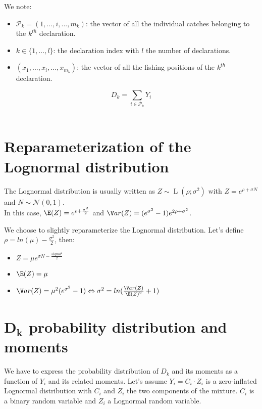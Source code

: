 We note:

\begin{itemize}
\item
  \(\boldsymbol{\mathcal{P}}_k=(1,...,i, ...,m_{k})\): the vector of all the individual catches belonging to the \(k^{th}\) declaration.
\item
  \(k \in \{1,...,l\}\): the declaration index with \(l\) the number of declarations.
\item
  \((x_1,...,x_i, ...,x_{m_k})\): the vector of all the fishing positions of the \(k^{th}\) declaration.
\end{itemize}

\[D_k=\sum_{i \in \boldsymbol{\mathcal{P}}_k}{Y_{i}}\] \\

\section{Reparameterization of the Lognormal distribution}

The Lognormal distribution is usually written as \(Z \sim \operatorname{L}(\rho;\sigma^2)\) with \(Z=e^{\rho+\sigma N}\) and \(N \sim \mathcal{N}(0,1)\). \\

In this case, \(\E(Z)=e^{\rho + \frac{\sigma^2}{2}}\) and \(\V ar(Z)=(e^{\sigma^2}-1)e^{2 \rho + \sigma^2}\).

We choose to slightly reparameterize the Lognormal distribution. Let's define \(\rho = ln(\mu) - \frac{\sigma^2}{2}\), then:

\begin{itemize}
\item
  \(Z=\mu e^{\sigma N - \frac{sigma^2}{2}}\)
\item
  \(\E(Z)=\mu\)
\item
  \(\V ar(Z)=\mu^2(e^{\sigma^2} - 1) \Leftrightarrow \sigma^2=ln(\frac{\V ar(Z)}{\E(Z)^2} + 1)\)
\end{itemize}

\section{\(\mathbf{D_k}\) probability distribution and moments}

We have to express the probability distribution of \(D_k\) and its moments as a function of \(Y_{i}\) and its related moments. Let's assume \(Y_{i} = C_{i} \cdot Z_{i}\) is a zero-inflated Lognormal distribution with \(C_{i}\) and \(Z_i\) the two components of the mixture. \(C_{i}\) is a binary random variable and \(Z_{i}\) a Lognormal random variable.

